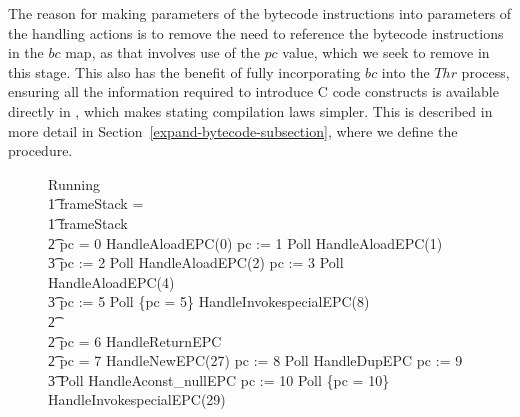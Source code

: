 The reason for making parameters of the bytecode instructions into
parameters of the handling actions is to remove the need to reference
the bytecode instructions in the $bc$ map, as that involves use of the
$pc$ value, which we seek to remove in this stage.
This also has the benefit of fully incorporating $bc$ into the $Thr$
process, ensuring all the information required to introduce C code
constructs is available directly in \Circus{}, which makes stating
compilation laws simpler.
This is described in more detail in
Section~\ref{expand-bytecode-subsection}, where we define the
 procedure.

\begin{figure}[t!]
  \setlength{\zedindent}{0cm}
  \setlength{\zedtab}{0.3cm}
  \setlength{\zedleftsep}{0.1cm}
  \begin{circus}
    Running \circdef \\
    \t1 \circif frameStack = \emptyset \circthen \Skip \\
    \t1 {} \circelse frameStack \neq \emptyset \circthen {} \\
    \t2 \circif pc = 0 \circthen HandleAloadEPC(0) \circseq pc := 1 \circseq Poll \circseq HandleAloadEPC(1) \circseq \\
    \t3 pc := 2 \circseq Poll \circseq HandleAloadEPC(2) \circseq pc := 3 \circseq Poll \circseq HandleAloadEPC(4) \circseq \\
    \t3 pc := 5 \circseq Poll \circseq \{pc = 5\} \circseq HandleInvokespecialEPC(8) \\
    \t2 {} \cdots {} \\
    \t2 {} \circelse pc = 6 \circthen HandleReturnEPC \\
    \t2 {} \circelse pc = 7 \circthen HandleNewEPC(27) \circseq pc := 8 \circseq Poll \circseq HandleDupEPC \circseq pc := 9 \circseq \\
    \t3 Poll \circseq HandleAconst\_nullEPC \circseq pc := 10 \circseq Poll \circseq \{pc = 10\} \circseq HandleInvokespecialEPC(29) \\

\end{circus}
\end{figure}
